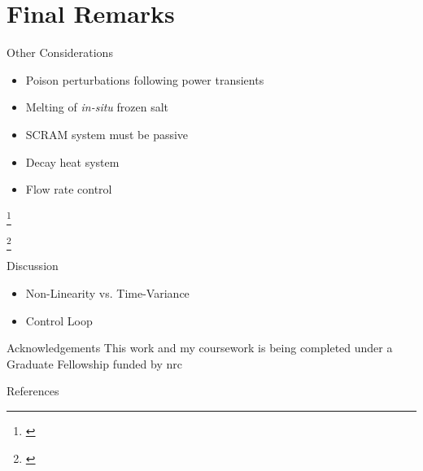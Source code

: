 \documentclass[aspectratio=1610,pdftex,dvipsnames]{beamer}
\newcommand\blfootnote[1]{%
  \begingroup
  \renewcommand\thefootnote{}\footnote{#1}%
  \addtocounter{footnote}{-1}%
  \endgroup
}
\newcommand{\acf}{\acrfull} %
\begin{document}
\section{Final Remarks}
\begin{frame}{Other Considerations}
    \begin{itemize}
        \item Poison perturbations following power transients \cite{Roberson}
        \item Melting of \textit{in-situ} frozen salt
        \item SCRAM system must be passive
        \item Decay heat system \cite{DecayHeat}
        \item Flow rate control
    \end{itemize}

    \blfootnote{\tiny\cite{Roberson} \tiny{}}
    \blfootnote{\tiny\cite{DecayHeat} \tiny{}}
\end{frame}

\begin{frame}{Discussion}
    \begin{itemize}
        \item Non-Linearity vs. Time-Variance
        \item Control Loop
    \end{itemize}
\end{frame}

\begin{frame}{Acknowledgements}
    \centering
    This work and my coursework is being completed under a Graduate Fellowship funded by \acf{nrc}
\end{frame}


\begin{frame}{References}
    
    \footnotesize
    
\end{frame}
\end{document}

